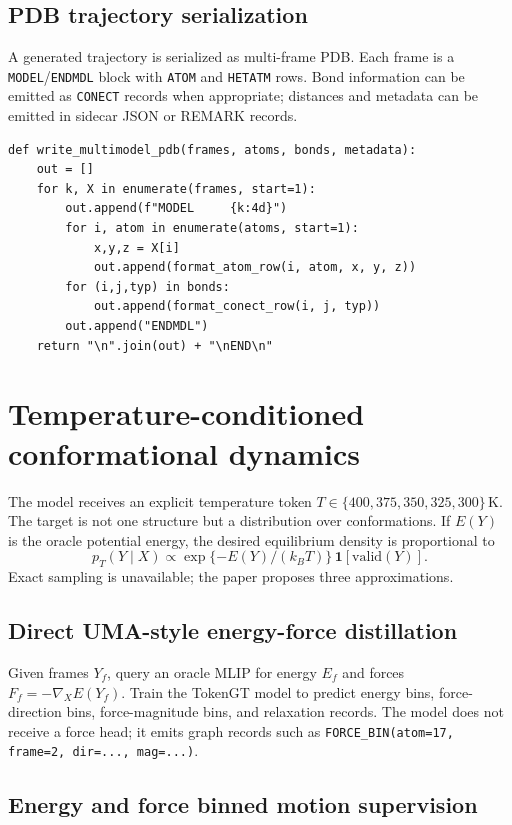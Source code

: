 \documentclass[11pt]{article}
\newcommand{\1}{\mathbf{1}}
\begin{document}
\subsection{PDB trajectory serialization}

A generated trajectory is serialized as multi-frame PDB. Each frame is a \texttt{MODEL}/\texttt{ENDMDL} block with \texttt{ATOM} and \texttt{HETATM} rows. Bond information can be emitted as \texttt{CONECT} records when appropriate; distances and metadata can be emitted in sidecar JSON or REMARK records.

\begin{lstlisting}[caption={PDB trajectory writer.}]
def write_multimodel_pdb(frames, atoms, bonds, metadata):
    out = []
    for k, X in enumerate(frames, start=1):
        out.append(f"MODEL     {k:4d}")
        for i, atom in enumerate(atoms, start=1):
            x,y,z = X[i]
            out.append(format_atom_row(i, atom, x, y, z))
        for (i,j,typ) in bonds:
            out.append(format_conect_row(i, j, typ))
        out.append("ENDMDL")
    return "\n".join(out) + "\nEND\n"
\end{lstlisting}

\section{Temperature-conditioned conformational dynamics}

The model receives an explicit temperature token $T\in\{400,375,350,325,300\}\,\mathrm K$. The target is not one structure but a distribution over conformations. If $E(Y)$ is the oracle potential energy, the desired equilibrium density is proportional to
\[
  p_T(Y\mid X)\propto \exp\{-E(Y)/(k_B T)\}\,\mathbf 1[\mathrm{valid}(Y)].
\]
Exact sampling is unavailable; the paper proposes three approximations.

\subsection{Direct UMA-style energy-force distillation}

Given frames $Y_f$, query an oracle MLIP for energy $E_f$ and forces $F_f=-\nabla_X E(Y_f)$. Train the TokenGT model to predict energy bins, force-direction bins, force-magnitude bins, and relaxation records. The model does not receive a force head; it emits graph records such as \texttt{FORCE\_BIN(atom=17, frame=2, dir=..., mag=...)}.

\subsection{Energy and force binned motion supervision}
\end{document}
